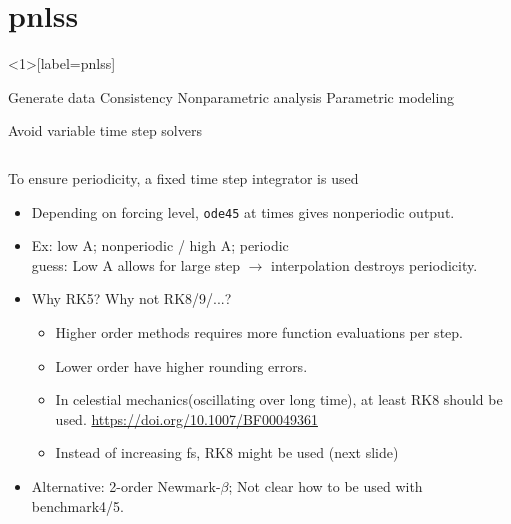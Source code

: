 \documentclass[9pt]{beamer}
\begin{document}
\section{pnlss}
\label{sec:generate-data}

\begin{frame}<1>[label=pnlss]
  \begin{center}
  \end{center}
  \alert<1>{Generate data} \newline
  \alert<2>{Consistency} \newline
  \alert<3>{Nonparametric analysis} \newline
  \alert<4>{Parametric modeling}
\end{frame}

\begin{frame}{Avoid variable time step solvers}
  \begin{columns}
    \begin{column}{0.5\textwidth}
      To ensure periodicity, a fixed time step integrator is used
      \begin{itemize}
      \item Depending on forcing level, \texttt{ode45} at times gives nonperiodic
        output.
      \item Ex: low A; nonperiodic / high A; periodic\\
        guess: Low A allows for large step $\rightarrow$ interpolation destroys
        periodicity.
      \item Why RK5? Why not RK8/9/...?
        \begin{itemize}
        \item Higher order methods requires more function evaluations per step.
        \item Lower order have higher rounding errors.\\
        \item In celestial mechanics(oscillating over long time), at least RK8
          should be used. \url{https://doi.org/10.1007/BF00049361}
        \item Instead of increasing fs, RK8 might be used (next slide)
        \end{itemize}
      \item Alternative: 2-order Newmark-$\beta$; Not clear how to be used with
        benchmark4/5.
      \end{itemize}


\end{column}
\end{columns}
\end{frame}
\end{document}
